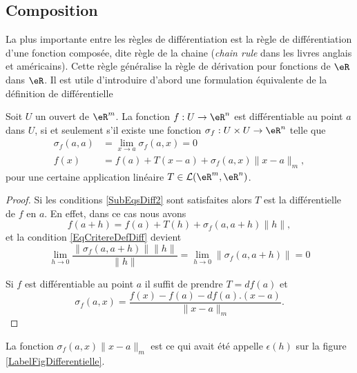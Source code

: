 \subsection{Composition}

La plus importante entre les règles de différentiation est la règle de différentiation d'une fonction composée, dite règle de la chaine (\emph{chain rule} dans les livres anglais et américains). Cette règle généralise la règle de dérivation pour fonctions de $\eR$ dans $\eR$. Il est utile d'introduire d'abord une formulation équivalente de la définition de différentielle
\begin{lemma}\label{Def_diff2}
  Soit $U$ un ouvert de $\eR^m$. La fonction $f: U\to\eR^n$ est différentiable au point $a$ dans $U$, si et seulement s'il existe une fonction $\sigma_f: U\times U\to \eR^n$ telle que
  \begin{subequations}		\label{SubEqsDiff2}
	  \begin{align}
  		\sigma_f(a,a)&=\lim_{x\to a} \sigma_f(a,x)=0\\
		 f(x)&=f(a)+T(x-a)+\sigma_f(a,x)\|x-a\|_m,   \label{def_diff2}
	  \end{align}
  \end{subequations}
pour une certaine application linéaire $T\in\mathcal{L}(\eR^m,\eR^n)$.
\end{lemma}
\begin{proof}
	Si les conditions \eqref{SubEqsDiff2} sont satisfaites alors $T$ est la différentielle de $f$ en $a$. En effet, dans ce cas nous avons
	\begin{equation}
		f(a+h)=f(a)+T(h)+\sigma_f(a,a+h)\| h \|,
	\end{equation}
	et la condition \eqref{EqCritereDefDiff} devient
	\begin{equation}
		\lim_{h\to 0} \frac{ \| \sigma_f(a,a+h) \|\| h \| }{ \| h \| }=\lim_{h\to 0} \| \sigma_f(a,a+h)\| =0
	\end{equation}
	
 
Si $f$ est différentiable au point $a$ il suffit de prendre $T=df(a)$ et 
\[
\sigma_f(a,x)=\frac{f(x)-f(a)-df(a).(x-a)}{\|x-a\|_m}.
\]
\end{proof}

\begin{remark}
	La fonction $\sigma_f(a,x)\| x-a \|_m$ est ce qui avait été appelle $\epsilon(h)$ sur la figure \ref{LabelFigDifferentielle}.
\end{remark}

